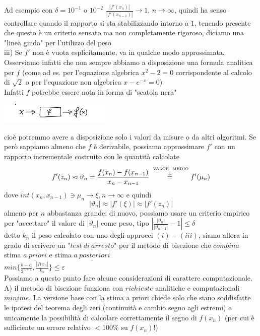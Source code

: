 \documentclass[12pt]{article}
\begin{document}
Ad esempio con $\delta = 10^{-1}$ o $10^{-2}$ $\frac{|f'(x_n)|}{|f'(x_{n-1})|} \to 1$, $n \to \infty$, quindi ha senso controllare quando il rapporto si sta stabilizzando intorno a $1$, tenendo presente che questo è un criterio sensato ma non completamente rigoroso, diciamo una "linea guida" per l'utilizzo del peso \\ 
iii) Se $f'$ non è vuota esplicitamente, va in qualche modo approssimata.\\Osserviamo infatti che non sempre abbiamo a disposizione una formula analitica per $f$ (come ad es. per l'equazione algebrica $x^2-2=0$ corrispondente al calcolo di $\sqrt{2}$ o per l'equazione non algebrica $x-e^{-x}=0$)\\Infatti $f$ potrebbe essere nota in forma di "scatola nera"\\
\begin{center}
\includegraphics[width=0.4\textwidth]{scatolanera.PNG}    
\end{center}
cioè potremmo avere a disposizione solo i valori da misure o da altri algoritmi. Se però sappiamo almeno che $f$ è derivabile, possiamo approssimare $f'$ con un rapporto incrementale costruito con le quantità calcolate \\ 
\[f'(z_n)\approx \vartheta_n=\frac{f(x_n)-f(x_{n-1})}{x_n-x_{n-1}}\overset{\overset{\text{\tiny{ VALOR \ MEDIO}} }{\downarrow}}{=} f'(\mu_n)\]
dove $int(x_n,x_{n-1})\ni \mu_n \rightarrow \xi, n\rightarrow\infty$ e quindi 
\[|\vartheta_n|\approx|f'(\xi)|\approx|f'(z_n)|\] almeno per $n$ abbastanza grande: di nuovo, possiamo usare un criterio empirico per "accettare" il valore di $|\vartheta_n|$ come peso, tipo $|\frac{|\vartheta_n|}{|\vartheta_{n-1}|}-1|\leq \delta$ \\
detto $k_n$ il peso calcolato con uno degli approcci $(i)-(iii)$, siamo allora in grado di scrivere un "$\underline{test \  di \  arresto}$" per il metodo di bisezione che $\underline{combina}$ stima $\underline{a \  priori}$ e stima $\underline{a \  posteriori}$\\
$min\{\frac{b-a}{2^{n+1}},\frac{|f(x_n|}{k_n}\}\leq \varepsilon$
\\Possiamo a questo punto fare alcune considerazioni di carattere computazionale.\\
A) il metodo di bisezione funziona con $\underline{richieste}$ analitiche e computazionali $\underline{minime}$.
La versione base con la stima a priori chiede solo che siano soddisfatte le ipotesi del teorema degli zeri (continuità e cambio segno agli estremi) e unicamente la possibilità di calcolare correttamente il segno di $f(x_n)$ (per cui è sufficiente un errore relativo $<100\%$ su $f(x_n)!$)
\end{document}
